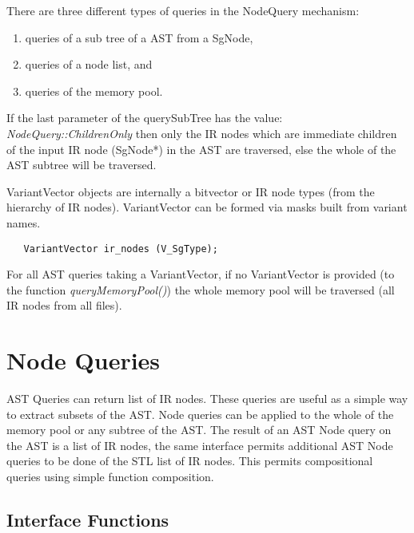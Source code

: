 There are three different types of queries in the NodeQuery mechanism:
\begin{enumerate}
   \item queries of a sub tree of a AST from a SgNode, 
   \item queries of a node list, and 
   \item queries of the memory pool. 
\end{enumerate}
If the last parameter of the querySubTree has the value: {\em NodeQuery::ChildrenOnly} 
then only the IR nodes which are immediate children of the input IR node 
(SgNode*) in the AST are traversed, else the whole of the AST subtree will be
traversed. 

VariantVector objects are internally a bitvector or IR node types (from the hierarchy of
IR nodes).  VariantVector can be formed via masks built from variant names.
{\mySmallFontSize
\begin{verbatim}
   VariantVector ir_nodes (V_SgType);

\end{verbatim}
}

For all AST queries taking a VariantVector, if no VariantVector is provided (to the 
function {\em queryMemoryPool()}) the whole memory pool will be traversed (all IR nodes
from all files).


\section{Node Queries}

    AST Queries can return list of IR nodes.  These queries are useful
as a simple way to extract subsets of the AST.  Node queries can be applied to 
the whole of the memory pool or any subtree of the AST.  The result of
an AST Node query on the AST is a list of IR nodes, the same interface
permits additional AST Node queries to be done of the STL list of IR nodes.
This permits compositional queries using simple function composition.

\subsection{Interface Functions}
   
